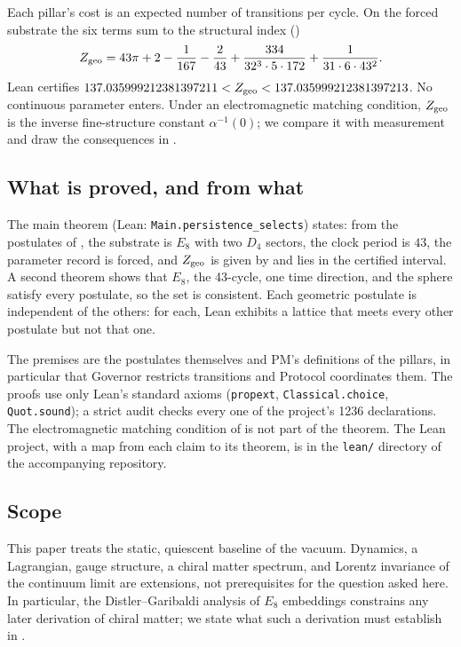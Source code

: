 Each pillar's cost is an expected number of transitions per cycle. On the forced substrate the six terms sum to the structural index ()
\begin{equation}
\label{eq:intro_index}
Z_{\rm geo}=43\pi+2-\frac{1}{167}-\frac{2}{43}+\frac{334}{32^3\cdot5\cdot172}+\frac{1}{31\cdot6\cdot43^2}.
\end{equation}
Lean certifies $137.035999212381397211<Z_{\rm geo}<137.035999212381397213$. No continuous parameter enters. Under an electromagnetic matching condition, $Z_{\rm geo}$ is the inverse fine-structure constant $\alpha^{-1}(0)$; we compare it with measurement and draw the consequences in .

\subsection{What is proved, and from what}
The main theorem (Lean: \texttt{Main.\allowbreak persistence\_selects}) states: from the postulates of , the substrate is $E_8$ with two $D_4$ sectors, the clock period is $43$, the parameter record is forced, and $Z_{\rm geo}$ is given by  and lies in the certified interval. A second theorem shows that $E_8$, the 43-cycle, one time direction, and the sphere satisfy every postulate, so the set is consistent. Each geometric postulate is independent of the others: for each, Lean exhibits a lattice that meets every other postulate but not that one.

The premises are the postulates themselves and PM's definitions of the pillars, in particular that Governor restricts transitions and Protocol coordinates them. The proofs use only Lean's standard axioms (\texttt{propext}, \texttt{Classical.choice}, \texttt{Quot.sound}); a strict audit checks every one of the project's 1236 declarations. The electromagnetic matching condition of  is not part of the theorem. The Lean project, with a map from each claim to its theorem, is in the \texttt{lean/} directory of the accompanying repository.

\subsection{Scope}
This paper treats the static, quiescent baseline of the vacuum. Dynamics, a Lagrangian, gauge structure, a chiral matter spectrum, and Lorentz invariance of the continuum limit are extensions, not prerequisites for the question asked here. In particular, the Distler--Garibaldi analysis of $E_8$ embeddings\cite{distler_there_2010} constrains any later derivation of chiral matter; we state what such a derivation must establish in .
